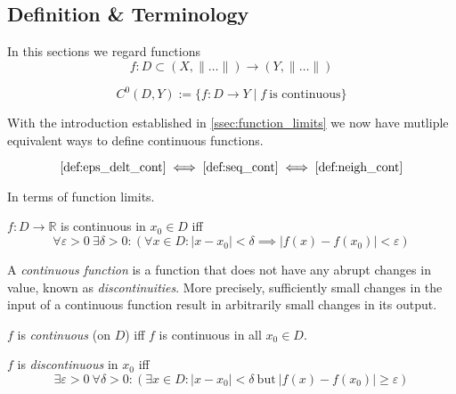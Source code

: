 \subsection{Definition \& Terminology}
In this sections we regard functions
\[f: D \subset (X, \|\ldots\|) \to (Y, \|\ldots\|)\]
\begin{definition}
   \[C^0(D, Y) := \{f: D \to Y \mid f~\text{is continuous}\}\]
\end{definition}
With the introduction established in \cref{ssec:function_limits} we now have mutliple equivalent ways to define continuous functions.
\begin{theorem}
   \[\text{\cref{def:eps_delt_cont}} \iff \text{\cref{def:seq_cont}} \iff \text{\cref{def:neigh_cont}}\]
\end{theorem}
In terms of function limits.
\begin{definition}\label{def:eps_delt_cont}
   \(f: D \to \mathbb{R}\) is continuous in \(x_0 \in D\) iff
   \[\forall \varepsilon > 0~\exists \delta > 0: (\forall x \in D: |x-x_0| < \delta \implies |f(x) - f(x_0)| < \varepsilon)\]
\end{definition}
\begin{remark}[Intuition]
   A \emph{continuous function} is a function that does not have any abrupt changes in value, known as \emph{discontinuities}.
   More precisely, sufficiently small changes in the input of a continuous function result in arbitrarily small changes in its output.
\end{remark}
\begin{remark}[Terminology]
   \(f\) is \emph{continuous} (on \(D\)) iff \(f\) is continuous in all \(x_0 \in D\).

   \(f\) is \emph{discontinuous} in \(x_0\) iff
   \[\exists \varepsilon > 0~\forall \delta > 0: (\exists x \in D: |x - x_0| < \delta~\text{but}~|f(x) - f(x_0)| \geq \varepsilon)\]
\end{remark}
